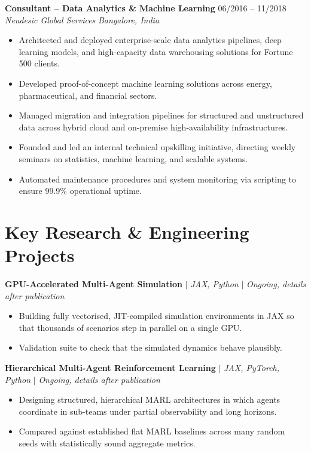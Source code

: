 \documentclass[10pt,a4paper]{article}
\begin{document}
\vspace{3pt}
\textbf{Consultant -- Data Analytics \& Machine Learning} \hfill 06/2016 -- 11/2018 \\
\textit{Neudesic Global Services} \hfill \textit{Bangalore, India}
\begin{itemize}[leftmargin=0.15in, label=$\bullet$]
    \item Architected and deployed enterprise-scale data analytics pipelines, deep learning models, and high-capacity data warehousing solutions for Fortune 500 clients.
    \item Developed proof-of-concept machine learning solutions across energy, pharmaceutical, and financial sectors.
    \item Managed migration and integration pipelines for structured and unstructured data across hybrid cloud and on-premise high-availability infrastructures.
    \item Founded and led an internal technical upskilling initiative, directing weekly seminars on statistics, machine learning, and scalable systems.
    \item Automated maintenance procedures and system monitoring via scripting to ensure 99.9\% operational uptime.
\end{itemize}

\section{Key Research \& Engineering Projects}
\textbf{GPU-Accelerated Multi-Agent Simulation} $|$ \textit{JAX, Python} $|$ \textit{Ongoing, details after publication} \\
\begin{itemize}[leftmargin=0.15in, label=$\bullet$]
    \item Building fully vectorised, JIT-compiled simulation environments in JAX so that thousands of scenarios step in parallel on a single GPU.
    \item Validation suite to check that the simulated dynamics behave plausibly.
\end{itemize}

\vspace{2pt}
\textbf{Hierarchical Multi-Agent Reinforcement Learning} $|$ \textit{JAX, PyTorch, Python} $|$ \textit{Ongoing, details after publication} \\
\begin{itemize}[leftmargin=0.15in, label=$\bullet$]
    \item Designing structured, hierarchical MARL architectures in which agents coordinate in sub-teams under partial observability and long horizons.
    \item Compared against established flat MARL baselines across many random seeds with statistically sound aggregate metrics.
\end{itemize}
\end{document}
